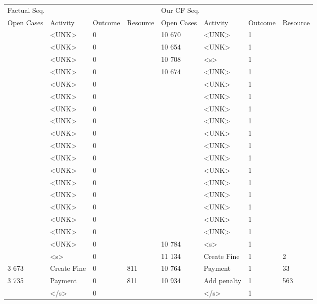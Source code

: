 \begin{tabular}{llllllll}
\toprule
\multicolumn{4}{l}{Factual Seq.} & \multicolumn{4}{l}{Our CF Seq.} \\
Open Cases & Activity & Outcome & Resource & Open Cases & Activity & Outcome & Resource \\
\midrule
 & <UNK> & 0 &  & 10 670 & <UNK> & 1 &  \\
 & <UNK> & 0 &  & 10 654 & <UNK> & 1 &  \\
 & <UNK> & 0 &  & 10 708 & <s> & 1 &  \\
 & <UNK> & 0 &  & 10 674 & <UNK> & 1 &  \\
 & <UNK> & 0 &  &  & <UNK> & 1 &  \\
 & <UNK> & 0 &  &  & <UNK> & 1 &  \\
 & <UNK> & 0 &  &  & <UNK> & 1 &  \\
 & <UNK> & 0 &  &  & <UNK> & 1 &  \\
 & <UNK> & 0 &  &  & <UNK> & 1 &  \\
 & <UNK> & 0 &  &  & <UNK> & 1 &  \\
 & <UNK> & 0 &  &  & <UNK> & 1 &  \\
 & <UNK> & 0 &  &  & <UNK> & 1 &  \\
 & <UNK> & 0 &  &  & <UNK> & 1 &  \\
 & <UNK> & 0 &  &  & <UNK> & 1 &  \\
 & <UNK> & 0 &  &  & <UNK> & 1 &  \\
 & <UNK> & 0 &  &  & <UNK> & 1 &  \\
 & <UNK> & 0 &  &  & <UNK> & 1 &  \\
 & <UNK> & 0 &  & 10 784 & <s> & 1 &  \\
 & <s> & 0 &  & 11 134 & Create Fine & 1 & 2 \\
3 673 & Create Fine & 0 & 811 & 10 764 & Payment & 1 & 33 \\
3 735 & Payment & 0 & 811 & 10 934 & Add penalty & 1 & 563 \\
 & </s> & 0 &  &  & </s> & 1 &  \\
\bottomrule
\end{tabular}

